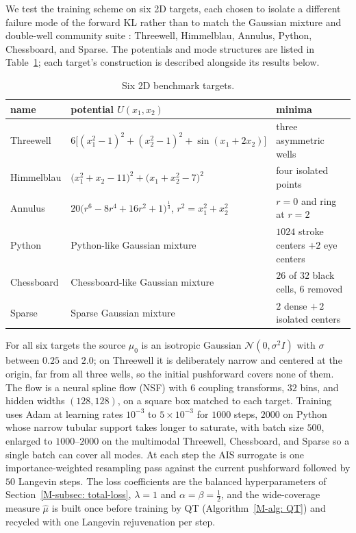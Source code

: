 \documentclass{article}
\begin{document}
We test the training scheme on six 2D targets, each chosen to isolate a different failure mode of the forward KL rather than to match the Gaussian mixture and double-well community suite \citep{akhound2024iterated,woo2024iefm}: Threewell, Himmelblau, Annulus, Python, Chessboard, and Sparse. The potentials and mode structures are listed in Table~\ref{tab: 2d-benchmark}; each target's construction is described alongside its results below.

\begin{table}[h]
    \centering
    \renewcommand{\arraystretch}{1.3}
    \begin{tabular}{@{}lll@{}}
        \toprule
        name & potential $U(x_1, x_2)$ & minima \\
        \midrule
        Threewell  & $6\bigl[(x_1^2 - 1)^2 + (x_2^2 - 1)^2 + \sin(x_1 + 2 x_2)\bigr]$ & three asymmetric wells \\
        Himmelblau & $\bigl(x_1^2 + x_2 - 11\bigr)^2 + \bigl(x_1 + x_2^2 - 7\bigr)^2$ & four isolated points \\
        Annulus    & $20 \bigl(r^6 - 8 r^4 + 16 r^2 + 1\bigr)^{\frac{1}{3}}$, $r^2 = x_1^2 + x_2^2$ & $r = 0$ and ring at $r = 2$ \\
        Python     & Python-like Gaussian mixture & $1024$ stroke centers $+ 2$ eye centers \\
        Chessboard & Chessboard-like Gaussian mixture & $26$ of $32$ black cells, $6$ removed \\
        Sparse     & Sparse Gaussian mixture & $2$ dense $+\, 2$ isolated centers \\
        \bottomrule
    \end{tabular}
    \caption{Six 2D benchmark targets.}
    \label{tab: 2d-benchmark}
\end{table}

For all six targets the source $\mu_0$ is an isotropic Gaussian $\mathcal{N}(0, \sigma^2 I)$ with $\sigma$ between $0.25$ and $2.0$; on Threewell it is deliberately narrow and centered at the origin, far from all three wells, so the initial pushforward covers none of them. The flow is a neural spline flow (NSF) \citep{durkan2019neural} with $6$ coupling transforms, $32$ bins, and hidden widths $(128, 128)$, on a square box matched to each target. Training uses Adam at learning rates $10^{-3}$ to $5\times 10^{-3}$ for $1000$ steps, $2000$ on Python whose narrow tubular support takes longer to saturate, with batch size $500$, enlarged to $1000$--$2000$ on the multimodal Threewell, Chessboard, and Sparse so a single batch can cover all modes. At each step the AIS surrogate is one importance-weighted resampling pass against the current pushforward followed by $50$ Langevin steps. The loss coefficients are the balanced hyperparameters of Section~\ref{M-subsec: total-loss}, $\lambda = 1$ and $\alpha = \beta = \frac12$, and the wide-coverage measure $\hat\mu$ is built once before training by QT (Algorithm~\ref{M-alg: QT}) and recycled with one Langevin rejuvenation per step.
\end{document}
